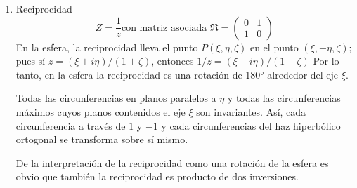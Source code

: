 \documentclass{matematicasud}
\begin{document}
\begin{enumerate}
\begin{proof}
            \begin{equation*}
                Z=\frac{\rho}{\bar{z^*}}=\rho z.
            \end{equation*}
        \end{proof}
        \item Reciprocidad
        \begin{equation}
            Z=\frac{1}{z} \text{con matriz asociada } \mathfrak{R}=
            \begin{pmatrix}
                0 & 1\\
                1 & 0
            \end{pmatrix}
            \label{eq:(33)}
        \end{equation}
        En la esfera, la reciprocidad lleva el punto $P(\xi,\eta,\zeta)$ en el punto $(\xi,-\eta,\zeta)$; pues sí $z=(\xi+i\eta)/(1+\zeta)$, entonces $1/z=(\xi-i\eta)/(1-\zeta)$ Por lo tanto, en la esfera la reciprocidad es una rotación de 180° alrededor del eje $\xi$.

        Todas las circunferencias en planos paralelos a $\eta$ y todas las circunferencias máximos cuyos planos contenidos el eje $\xi$ son invariantes. Así, cada circunferencia a través de $1$ y $-1$ y cada circunferencias del haz hiperbólico ortogonal se transforma sobre sí mismo.

        De la interpretación de la reciprocidad como una rotación de la esfera es obvio que también la reciprocidad es producto de dos inversiones.
\end{enumerate}
\end{document}
